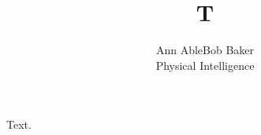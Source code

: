 \documentclass{article}
\begin{document}
\title{T}
\author{Ann Able\quad Bob Baker\\ Physical Intelligence}
\maketitle
Text.
\end{document}
